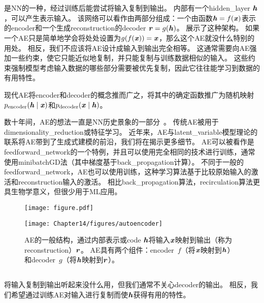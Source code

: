 \chapter{}
\label{chap:autoencoders}
是\gls{NN}的一种，经过训练后能尝试将输入复制到输出。
内部有一个\gls{hidden_layer} $\boldsymbol{\mathit{h}}$，可以产生表示输入。
该网络可以看作由两部分组成：一个由函数$ \boldsymbol{\mathit{h}} = f(\boldsymbol{\mathit{x}})$表示的\gls{encoder}和一个生成\gls{reconstruction}的\gls{decoder} $\boldsymbol{\mathit{r}}=g(\boldsymbol{\mathit{h}})$。
展示了这种架构。
如果一个\gls{AE}只是简单地学会将处处设置为$g(f(\boldsymbol{\mathit{x}})) =\boldsymbol{\mathit{x}}$，那么这个\gls{AE}就没什么特别的用处。
相反，我们不应该将\gls{AE}设计成输入到输出完全相等。
这通常需要向\gls{AE}强加一些约束，使它只能近似地复制，并只能复制与训练数据相似的输入。
这些约束强制模型考虑输入数据的哪些部分需要被优先复制，因此它往往能学习到数据的有用特性。


现代\gls{AE}将\gls{encoder}和\gls{decoder}的概念推而广之，将其中的确定函数推广为随机映射$p_{\text{encoder}} (\boldsymbol{\mathit{h}} \mid \boldsymbol{\mathit{x}})$和$p_{\text{decoder}}(\boldsymbol{\mathit{x}} \mid \boldsymbol{\mathit{h}})$。


数十年间，\gls{AE}的想法一直是\gls{NN}历史景象的一部分~\citep{Lecun-these87,Bourlard88,hinton1994amd-small}。
传统\gls{AE}被用于\gls{dimensionality_reduction}或特征学习。
近年来，\gls{AE}与\gls{latent_variable}模型理论的联系将\gls{AE}带到了生成式建模的前沿，我们将在揭示更多细节。
\gls{AE}可以被看作是\gls{feedforward_network}的一个特例，并且可以使用完全相同的技术进行训练，通常使用\gls{minibatch}\gls{GD}法（其中梯度基于\gls{back_propagation}计算）。
不同于一般的\gls{feedforward_network}，\gls{AE}也可以使用训练\citep{Hinton+McClelland-NIPS1987}，这种学习算法基于比较原始输入的激活和\gls{reconstruction}输入的激活。
相比\gls{back_propagation}算法，\gls{recirculation}算法更具生物学意义，但很少用于\gls{ML}应用。

\begin{figure}[!htb]
\ifOpenSource
\centerline{\texttt{[image: figure.pdf]}}
\else
\centerline{\texttt{[image: Chapter14/figures/autoencoder]}}
\fi
\caption{\gls{AE}的一般结构，通过内部表示或\gls{code} $\boldsymbol{\mathit{h}}$将输入$\boldsymbol{\mathit{x}}$映射到输出（称为\gls{reconstruction}）$\boldsymbol{\mathit{r}}$。
\gls{AE}具有两个组件：\gls{encoder}~$f$（将$\boldsymbol{\mathit{x}}$映射到$\boldsymbol{\mathit{h}}$）和\gls{decoder}~$g$（将$\boldsymbol{\mathit{h}}$映射到$\boldsymbol{\mathit{r}}$）。
}
\label{fig:chap14_autoencoder}
\end{figure}


\section{}
\label{sec:undercomplete_autoencoders}
将输入复制到输出听起来没什么用，但我们通常不关心\gls{decoder}的输出。
相反，我们希望通过训练\gls{AE}对输入进行复制而使$\boldsymbol{\mathit{h}}$获得有用的特性。


